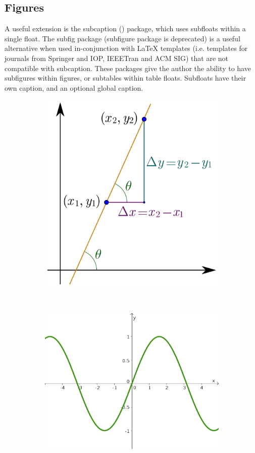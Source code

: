 \documentclass[11pt, a4paper]{article}
\begin{document}
\subsection{Figures}
A useful extension is the subcaption () package, which uses subfloats within a single float. The subfig package (subfigure package is deprecated) is a useful alternative when used in-conjunction with LaTeX templates (i.e. templates for journals from Springer and IOP, IEEETran and ACM SIG) that are not compatible with subcaption. These packages give the author the ability to have subfigures within figures, or subtables within table floats. Subfloats have their own caption, and an optional global caption.

\begin{figure}
	\centering
	\begin{subfigure}[b]{0.45\linewidth}
		\centering
		\includegraphics[width=0.75\linewidth]{slope}
		\caption{}
		\label{fig:slope}
	\end{subfigure}
	~
	\begin{subfigure}[b]{0.45\linewidth}
		\centering
		\includegraphics[width=\linewidth]{sine-graph}

\end{subfigure}
\end{figure}
\end{document}
